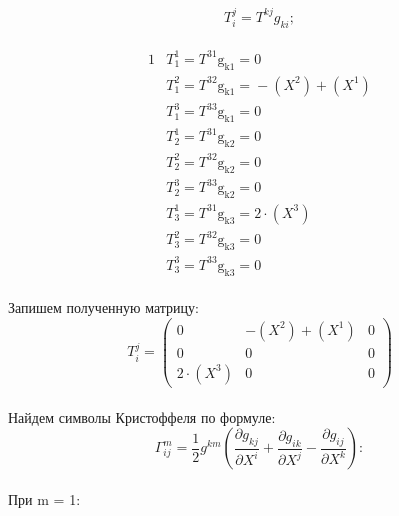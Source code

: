 \documentclass{article}
\begin{document}
\[
T^j_i = T^{kj}g_{ki};
\]\\
\begin{alignat*}{1}
  & T^1_1 = T^{31}\mathrm{g_{k1} = }0 \\
  & T^2_1 = T^{32}\mathrm{g_{k1} = }-(X^2) + (X^1) \\
  & T^3_1 = T^{33}\mathrm{g_{k1} = }0 \\
  & T^1_2 = T^{31}\mathrm{g_{k2} = }0 \\
  & T^2_2 = T^{32}\mathrm{g_{k2} = }0 \\
  & T^3_2 = T^{33}\mathrm{g_{k2} = }0 \\
  & T^1_3 = T^{31}\mathrm{g_{k3} = }2\cdot (X^3) \\
  & T^2_3 = T^{32}\mathrm{g_{k3} = }0 \\
  & T^3_3 = T^{33}\mathrm{g_{k3} = }0 
\end{alignat*}\\
Запишем полученную матрицу:\\
\[
T^j_i=\begin{pmatrix}
	0 & -(X^2) + (X^1) & 0\\
	0 & 0 & 0\\
	2\cdot (X^3) & 0 & 0
\end{pmatrix}
\]\\
Найдем символы Кристоффеля по формуле:\\
\[
\Gamma^m_{ij} = \frac{1}{2}g^{km}(\frac{\partial g_{kj}}{\partial X^i} + \frac{\partial g_{ik}}{\partial X^j} - \frac{\partial g_{ij}}{\partial X^k}):
\]\\
При m = 1:\\
\end{document}
